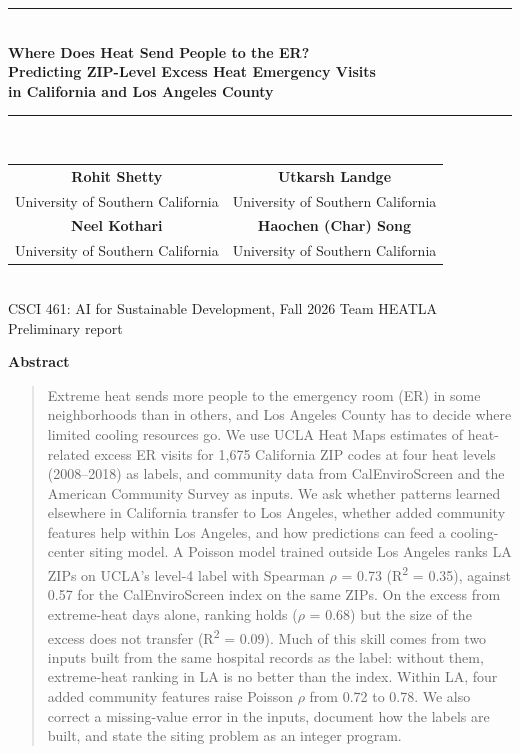 \documentclass[10pt]{article}
\newcommand{\rhoS}{$\rho$}
\begin{document}
\begin{center}
\rule{\textwidth}{4pt}\\[10pt]
{\LARGE\bfseries Where Does Heat Send People to the ER?\\[4pt] Predicting ZIP-Level Excess Heat Emergency Visits\\[2pt] in California and Los Angeles County}\\[8pt]
\rule{\textwidth}{1pt}\\[14pt]
\begin{tabular}{cc}
\textbf{Rohit Shetty} & \textbf{Utkarsh Landge}\\
University of Southern California & University of Southern California\\[8pt]
\textbf{Neel Kothari} & \textbf{Haochen (Char) Song}\\
University of Southern California & University of Southern California\\
\end{tabular}\\[6pt]
{\small CSCI 461: AI for Sustainable Development, Fall 2026 \quad Team HEATLA \quad Preliminary report}
\end{center}

\begin{center}\textbf{\large Abstract}\end{center}
\begin{quote}\small
Extreme heat sends more people to the emergency room (ER) in some neighborhoods than in others, and Los Angeles County has to decide where limited cooling resources go. We use UCLA Heat Maps estimates of heat-related excess ER visits for 1,675 California ZIP codes at four heat levels (2008--2018) as labels, and community data from CalEnviroScreen and the American Community Survey as inputs. We ask whether patterns learned elsewhere in California transfer to Los Angeles, whether added community features help within Los Angeles, and how predictions can feed a cooling-center siting model. A Poisson model trained outside Los Angeles ranks LA ZIPs on UCLA's level-4 label with Spearman \rhoS{} = 0.73 (R\textsuperscript{2} = 0.35), against 0.57 for the CalEnviroScreen index on the same ZIPs. On the excess from extreme-heat days alone, ranking holds (\rhoS{} = 0.68) but the size of the excess does not transfer (R\textsuperscript{2} = 0.09). Much of this skill comes from two inputs built from the same hospital records as the label: without them, extreme-heat ranking in LA is no better than the index. Within LA, four added community features raise Poisson \rhoS{} from 0.72 to 0.78. We also correct a missing-value error in the inputs, document how the labels are built, and state the siting problem as an integer program.
\end{quote}
\end{document}

